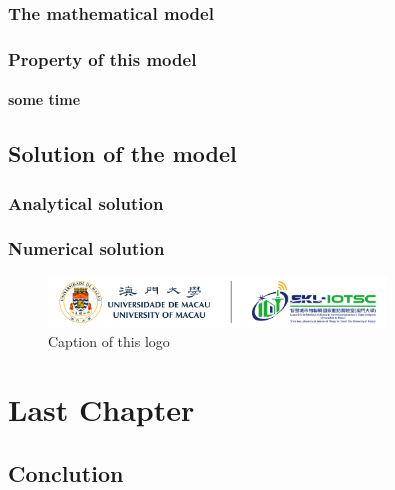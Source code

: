 \documentclass[12pt]{report}
\begin{document}
\subsection{The mathematical model}
  \lipsum[4]
\subsection{Property of this model}
\lipsum[5]

\subsubsection{some time}

\lipsum[6]
\section{Solution of the model}
  \lipsum[6]
\subsection{Analytical solution}
  \lipsum[7]
\subsection{Numerical solution}
\lipsum[8]

\begin{figure}[h]
  \centering
  \includegraphics[width=0.8\textwidth]{pics/iotscUMLogo.png}  
  \caption{Caption of this logo}
\end{figure}


\chapter{Last Chapter}
\section{Conclution}
  \lipsum[1]
\end{document}

